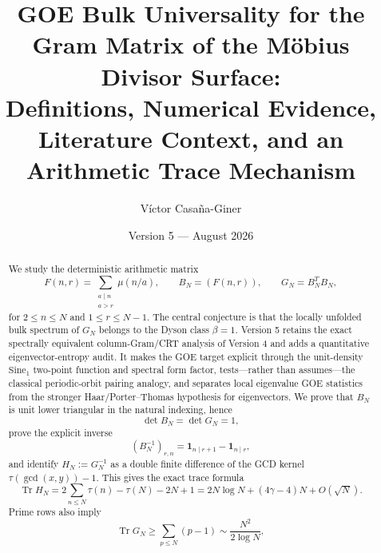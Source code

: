 \documentclass[11pt]{amsart}
\title[GOE Bulk Universality for the M\"obius Divisor Surface]{GOE Bulk Universality for the Gram Matrix of the M\"obius Divisor Surface:\\
Definitions, Numerical Evidence, Literature Context, and an Arithmetic Trace Mechanism}
\author{V\'ictor Casa\~na-Giner}
\date{Version 5 --- August 2026}
\numberwithin{equation}{section}
\theoremstyle{plain}
\theoremstyle{definition}
\theoremstyle{remark}
\newcommand{\mob}{\mu}
\newcommand{\Tr}{\operatorname{Tr}}
\begin{document}
\begin{abstract}
We study the deterministic arithmetic matrix
\begin{equation}
F(n,r)=\sum_{\substack{a\mid n\\ a>r}}\mob(n/a),
\qquad
B_N=(F(n,r)),
\qquad
G_N=B_N^TB_N,
\label{eq:abstract_surface}
\end{equation}
for $2\le n\le N$ and $1\le r\le N-1$.  The central conjecture is that the locally unfolded bulk spectrum of $G_N$ belongs to the Dyson class $\beta=1$.  Version 5 retains the exact spectrally equivalent column-Gram/CRT analysis of Version 4 and adds a quantitative eigenvector-entropy audit.  It makes the GOE target explicit through the unit-density $\mathrm{Sine}_1$ two-point function and spectral form factor, tests---rather than assumes---the classical periodic-orbit pairing analogy, and separates local eigenvalue GOE statistics from the stronger Haar/Porter--Thomas hypothesis for eigenvectors.  We prove that $B_N$ is unit lower triangular in the natural indexing, hence
\begin{equation}
\det B_N=\det G_N=1,
\label{eq:abstract_unimodular}
\end{equation}
prove the explicit inverse
\begin{equation}
(B_N^{-1})_{r,n}=\mathbf 1_{n\mid r+1}-\mathbf 1_{n\mid r},
\label{eq:abstract_inverse}
\end{equation}
and identify $H_N:=G_N^{-1}$ as a double finite difference of the GCD kernel $\tau(\gcd(x,y))-1$.  This gives the exact trace formula
\begin{equation}
\Tr H_N
=2\sum_{n\le N}\tau(n)-\tau(N)-2N+1
=2N\log N+(4\gamma-4)N+O(\sqrt N).
\label{eq:abstract_inverse_trace}
\end{equation}
Prime rows also imply
\begin{equation}
\Tr G_N\ge \sum_{p\le N}(p-1)
\sim \frac{N^2}{2\log N},
\label{eq:abstract_trace_lower}
\end{equation}

\end{abstract}
\end{document}
